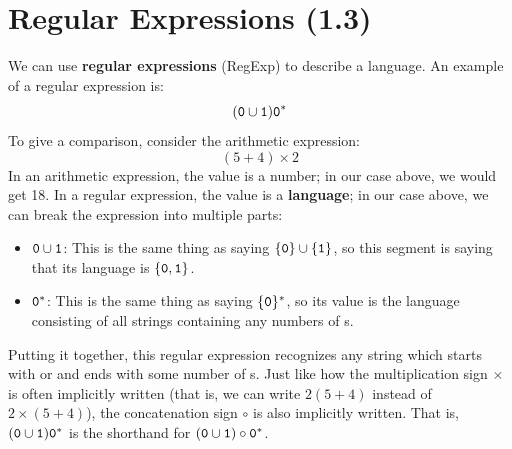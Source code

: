 \documentclass[letterpaper]{article}
\begin{document}
\section{Regular Expressions (1.3)}
We can use \textbf{regular expressions} (RegExp) to describe a language. An example of a regular expression is: 
\[(\texttt{0} \cup \texttt{1}) \texttt{0}^*\]
To give a comparison, consider the arithmetic expression:
\[(5 + 4) \times 2\]
In an arithmetic expression, the value is a number; in our case above, we would get 18. In a regular expression, the value is a \textbf{language}; in our case above, we can break the expression into multiple parts: 
\begin{itemize}
    \item $\texttt{0} \cup \texttt{1}$: This is the same thing as saying $\{\texttt{0}\} \cup \{\texttt{1}\}$, so this segment is saying that its language is $\{\texttt{0}, \texttt{1}\}$.
    \item $\texttt{0}^*$: This is the same thing as saying $\{\texttt{0}\}^*$, so its value is the language consisting of all strings containing any numbers of s.
\end{itemize}
Putting it together, this regular expression recognizes any string which starts with  or  and ends with some number of s. Just like how the multiplication sign $\times$ is often implicitly written (that is, we can write $2(5 + 4)$ instead of $2 \times (5 + 4)$), the concatenation sign $\circ$ is also implicitly written. That is, $(\texttt{0} \cup \texttt{1}) \texttt{0}^*$ is the shorthand for $(\texttt{0} \cup \texttt{1}) \circ \texttt{0}^*$. 
\end{document}

